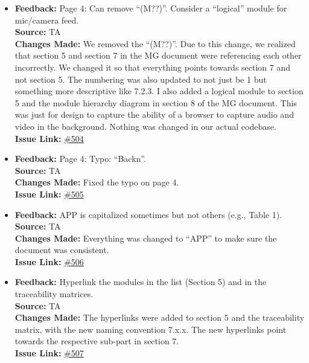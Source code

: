 \documentclass{article}
\begin{document}
\begin{itemize}
    \item
      \textbf{Feedback:} Page 4: Can remove “(M??)”. Consider a “logical” module for mic/camera feed. \\
      \textbf{Source:} TA \\
      \textbf{Changes Made:} We removed the “(M??)”. Due to this change, we realized that section 5 and section 7 in the MG document were referencing each other incorrectly. We changed it so that everything points towards section 7 and not section 5. The numbering was also updated to not just be 1 but something more descriptive like 7.2.3. I also added a logical module to section 5 and the module hierarchy diagram in section 8 of the MG document. This was just for design to capture the ability of a browser to capture audio and video in the background. Nothing was changed in our actual codebase. \\
      \textbf{Issue Link:} \href{https://github.com/parishanizam/TeleHealth/issues/504}{\#504}
    
    \item
      \textbf{Feedback:} Page 4: Typo: “Backn”. \\
      \textbf{Source:} TA \\
      \textbf{Changes Made:} Fixed the typo on page 4. \\
      \textbf{Issue Link:} \href{https://github.com/parishanizam/TeleHealth/issues/505}{\#505}
    
    \item
      \textbf{Feedback:} APP is capitalized sometimes but not others (e.g., Table 1). \\
      \textbf{Source:} TA \\
      \textbf{Changes Made:} Everything was changed to “APP” to make sure the document was consistent. \\
      \textbf{Issue Link:} \href{https://github.com/parishanizam/TeleHealth/issues/506}{\#506}
    
    \item
      \textbf{Feedback:} Hyperlink the modules in the list (Section 5) and in the traceability matrices. \\
      \textbf{Source:} TA \\
      \textbf{Changes Made:} The hyperlinks were added to section 5 and the traceability matrix, with the new naming convention 7.x.x. The new hyperlinks point towards the respective sub-part in section 7. \\
      \textbf{Issue Link:} \href{https://github.com/parishanizam/TeleHealth/issues/507}{\#507}
    

\end{itemize}
\end{document}
